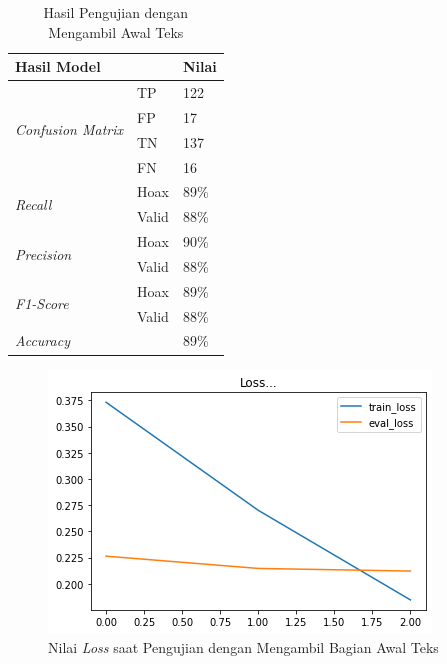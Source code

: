 \begin{table}[h]
    \caption{Hasil Pengujian dengan Mengambil Awal Teks}
    \label{tab: const_awal}
    \centering
    \begin{tabular}{|l|l|l|}
        \hline
        \multicolumn{2}{|l|}{\textbf{Hasil Model}} & \textbf{Nilai}        \\ \hline
        \multirow{4}{*}{\textit{Confusion Matrix}} & TP             & 122  \\ \cline{2-3}
                                                   & FP             & 17   \\ \cline{2-3}
                                                   & TN             & 137  \\ \cline{2-3}
                                                   & FN             & 16   \\ \hline
        \multirow{2}{*}{\textit{Recall}}           & Hoax           & 89\% \\ \cline{2-3}
                                                   & Valid          & 88\% \\ \hline
        \multirow{2}{*}{\textit{Precision}}        & Hoax           & 90\% \\ \cline{2-3}
                                                   & Valid          & 88\% \\ \hline
        \multirow{2}{*}{\textit{F1-Score}}         & Hoax           & 89\% \\ \cline{2-3}
                                                   & Valid          & 88\% \\ \hline
        \multicolumn{2}{|l|}{\textit{Accuracy}}    & 89\%                  \\ \hline
    \end{tabular}
\end{table}

\begin{figure}[h]
    \begin{center}
        \includegraphics[width= 0.9\linewidth]{gambar/loss_concat_awal.png}
        \caption{Nilai \textit{Loss} saat Pengujian dengan Mengambil Bagian Awal Teks}
        \label{fig: loss_const_awal}
    \end{center}
\end{figure}


